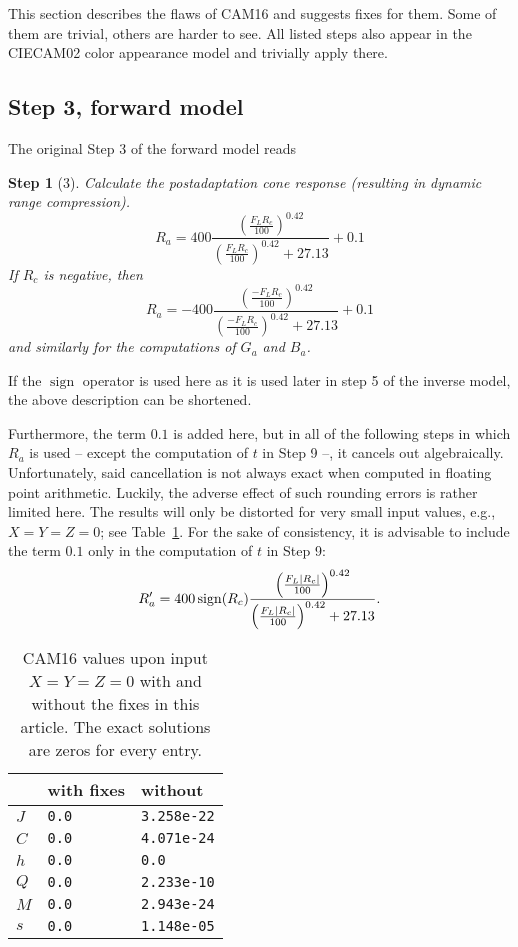 \documentclass[twocolumn]{scrartcl}
\theoremstyle{named}
\newtheorem*{step}{Step}
\DeclarePairedDelimiter\abs{\lvert}{\rvert}%
\DeclareMathOperator{\sign}{sign}
\begin{document}
This section describes the flaws of CAM16 and suggests fixes for them. Some of
them are trivial, others are harder to see. All listed steps also appear in the
CIECAM02 color appearance model and trivially apply there.

\subsection{Step 3, forward model}

The original Step 3 of the forward model reads

\begin{step}[3]
Calculate the postadaptation cone response
(resulting in dynamic range compression).
\[
  R_a = 400 \frac{\left(\frac{F_L R_c}{100}\right)^{0.42}}{\left(\frac{F_L R_c}{100}\right)^{0.42} + 27.13} + 0.1
\]
If $R_c$ is negative, then
\[
  R_a = -400 \frac{\left(\frac{-F_L R_c}{100}\right)^{0.42}}{\left(\frac{-F_L R_c}{100}\right)^{0.42} + 27.13} + 0.1
\]
and similarly for the computations of $G_a$ and $B_a$.
\end{step}

If the $\sign$ operator is used here as it is used later in step 5 of the
inverse model, the above description can be shortened.

Furthermore, the term $0.1$ is added here, but in all of the following steps in
which $R_a$ is used -- except the computation of $t$ in Step 9 --, it cancels
out algebraically.  Unfortunately, said cancellation is not always exact when
computed in floating point arithmetic. Luckily, the adverse effect of such
rounding errors is rather limited here. The results will only be distorted for
very small input values, e.g., $X=Y=Z=0$; see Table~\ref{tab:zero}. For the
sake of consistency, it is advisable to include the term $0.1$ only in the
computation of $t$ in Step 9:
\[
  R'_a = 400 \sign(R_c) \frac{{\left(\frac{F_L \abs{R_c}}{100}\right)}^{0.42}}{{\left(\frac{F_L \abs{R_c}}{100}\right)}^{0.42} + 27.13}.
\]


\begin{table}\centering
  \begin{tabularx}{\linewidth}{XXX}
  \toprule
          & with fixes & without\\
  \midrule
    $J$ & \texttt{0.0} & \texttt{3.258e-22}\\
    $C$ & \texttt{0.0} & \texttt{4.071e-24}\\
    $h$ & \texttt{0.0} & \texttt{0.0}\\
    $Q$ & \texttt{0.0} & \texttt{2.233e-10}\\
    $M$ & \texttt{0.0} & \texttt{2.943e-24}\\
    $s$ & \texttt{0.0} & \texttt{1.148e-05}\\
  \bottomrule
\end{tabularx}
\caption{CAM16 values upon input $X=Y=Z=0$ with and without the fixes in
  this article.  The exact solutions are zeros for every
  entry.}\label{tab:zero}
\end{table}
\end{document}
